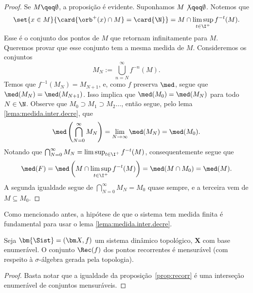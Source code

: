 \begin{proof}
Se $M \qeq \emptyset$, a proposição é evidente. Suponhamos $M \not\qeq \emptyset$.
Notemos que
	\begin{equation*}
	\set{x \in M}{\card{\orb^+(x) \cap M} = \card{\N}} = M \cap \limsup_{t \in \I^+} f^{-t}(M).
	\end{equation*}
Esse é o conjunto dos pontos de $M$ que retornam infinitamente para $M$. Queremos provar que esse conjunto tem a mesma medida de $M$. Consideremos os conjuntos
	\begin{equation*}
	M_N := \bigcup_{n=N}^\infty f^{-n}(M).
	\end{equation*}
Temos que $f^{-1}(M_N)=M_{N+1}$, e, como $f$ preserva $\med$, segue que $\med(M_N)=\med(M_{N+1})$. Isso implica que $\med(M_0)=\med(M_N)$ para todo $N \in \N$. Observe que $M_0 \supset M_1 \supset M_2 \ldots$, então segue, pelo lema \ref{lema:medida.inter.decre}, que
	\begin{equation*}
	\med\left( \bigcap_{N=0}^\infty M_N \right) = \lim_{N \to \infty} \med(M_N) = \med(M_0).
	\end{equation*}
Notando que $\bigcap_{N=0}^\infty M_N = \limsup_{t \in \I^+} f^{-t}(M)$, consequentemente segue que
	\begin{equation*}
	\med(F)= \med\left(M \cap \limsup_{t \in \I^+} f^{-t}(M) \right) =\med(M\cap M_0)=\med(M).
	\end{equation*}
A segunda igualdade segue de $\bigcap_{N=0}^\infty M_N = M_0$ quase sempre, e a terceira vem de $M \subseteq M_0$.
\end{proof}

Como mencionado antes, a hipótese de que o sistema tem medida finita é fundamental para usar o lema \ref{lema:medida.inter.decre}.

\begin{proposition}
Seja $\bm{\Sist}=(\bm X,f)$ um sistema dinâmico topológico, $\bm X$ com base enumerável. O conjunto $\Rec(f)$ dos pontos recorrentes é mensurável (com respeito à $\sigma$-álgebra gerada pela topologia).
\end{proposition}
\begin{proof}
Basta notar que a igualdade da proposição~\ref{prop:recorr} é uma interseção enumerável de conjuntos mensuráveis.
\end{proof}



